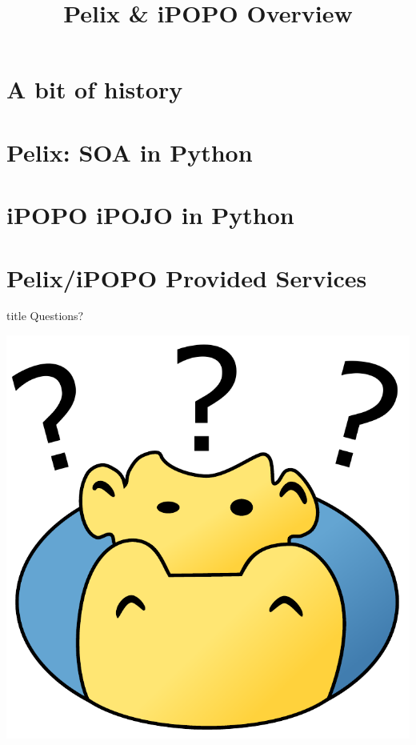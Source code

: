 \documentclass[table]{beamer}
\title[Pelix \& iPOPO]{Pelix \& iPOPO\: Overview}
\begin{document}
\frame{\titlepage}

\section{A bit of history}


\section{Pelix: SOA in Python}


\section{iPOPO\: iPOJO in Python}


\section{Pelix/iPOPO Provided Services}


\begin{frame}
  \vfill
  \centering
  \begin{beamercolorbox}[sep=8pt,center,shadow=true,rounded=true]{title}
    Questions?\par%
  \end{beamercolorbox}
  \vspace{3ex}
  \includegraphics[width=.6\textwidth]{../imgs/ipopo_question}
  \vfill
\end{frame}
\end{document}
